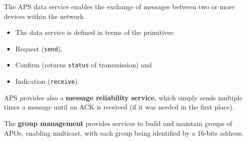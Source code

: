 The APS data service enables the exchange of messages between two or more devices within the network.
\begin{itemize}
   \item The data service is defined in terms of the primitives:
   \item Request (\texttt{send}),
   \item Confirm (returns \texttt{status} of transmission) and
   \item Indication (\texttt{receive}).
\end{itemize}

APS provides also a \textbf{message reliability service}, which simply sends multiple times a message until an ACK is received (if it was needed in the first place).

The \textbf{group management} provides services to build and maintain groups of APOs, enabling multicast, with each group being identified by a 16-bits address.



